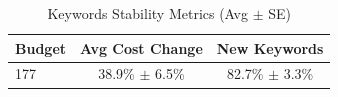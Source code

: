 \begin{table}[htbp]
\centering
\caption{Keywords Stability Metrics (Avg $\pm$ SE)}
\begin{tabular}{lcc}
\toprule
Budget & Avg Cost Change & New Keywords \\
\midrule
177 & 38.9\% $\pm$ 6.5\% & 82.7\% $\pm$ 3.3\% \\
\bottomrule
\end{tabular}
\end{table}